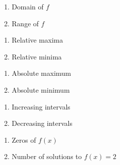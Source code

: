 \begin{multicols}{2}
\begin{enumerate}		\setcounter{enumi}{\value{Review}}
	\item Domain of $f$
    \item Range of $f$
\end{enumerate}	\setcounter{Review}{\value{enumi}}
\end{multicols}
\begin{multicols}{2}
\begin{enumerate}	\setcounter{enumi}{\value{Review}}  
    \item Relative maxima
    \item Relative minima
\end{enumerate}	\setcounter{Review}{\value{enumi}}
\end{multicols}
\begin{multicols}{2}
\begin{enumerate}	\setcounter{enumi}{\value{Review}}  
    \item Absolute maximum
    \item Absolute minimum
\end{enumerate}	\setcounter{Review}{\value{enumi}}
\end{multicols}
\begin{multicols}{2}
\begin{enumerate}	\setcounter{enumi}{\value{Review}}  
    \item Increasing intervals
    \item Decreasing intervals
\end{enumerate}	\setcounter{Review}{\value{enumi}}
\end{multicols}
\begin{multicols}{2}
\begin{enumerate}	\setcounter{enumi}{\value{Review}}  
    \item Zeros of $f(x)$
    \item Number of solutions to $f(x)=2$
\end{enumerate}		\setcounter{Review}{\value{enumi}}
\end{multicols}

\newpage

